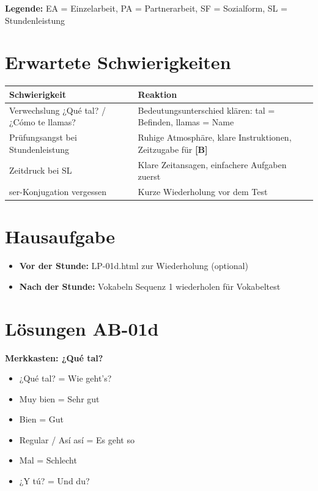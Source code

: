 \documentclass[11pt,a4paper]{article}
\newcommand{\B}{\textcolor{basis}{\textbf{[B]}}}
\begin{document}
\textbf{Legende:} EA = Einzelarbeit, PA = Partnerarbeit, SF = Sozialform, SL = Stundenleistung

\section{Erwartete Schwierigkeiten}

\begin{tabular}{|p{5cm}|p{8cm}|}
\hline
\textbf{Schwierigkeit} & \textbf{Reaktion} \\
\hline
Verwechslung ¿Qué tal? / ¿Cómo te llamas? & Bedeutungsunterschied klären: tal = Befinden, llamas = Name \\
\hline
Prüfungsangst bei Stundenleistung & Ruhige Atmosphäre, klare Instruktionen, Zeitzugabe für \B{} \\
\hline
Zeitdruck bei SL & Klare Zeitansagen, einfachere Aufgaben zuerst \\
\hline
ser-Konjugation vergessen & Kurze Wiederholung vor dem Test \\
\hline
\end{tabular}

\section{Hausaufgabe}

\begin{itemize}
    \item \textbf{Vor der Stunde:} LP-01d.html zur Wiederholung (optional)
    \item \textbf{Nach der Stunde:} Vokabeln Sequenz 1 wiederholen für Vokabeltest
\end{itemize}

\section{Lösungen AB-01d}

\textbf{Merkkasten: ¿Qué tal?}
\begin{itemize}
    \item ¿Qué tal? = Wie geht's?
    \item Muy bien = Sehr gut
    \item Bien = Gut
    \item Regular / Así así = Es geht so
    \item Mal = Schlecht
    \item ¿Y tú? = Und du?
\end{itemize}
\end{document}
